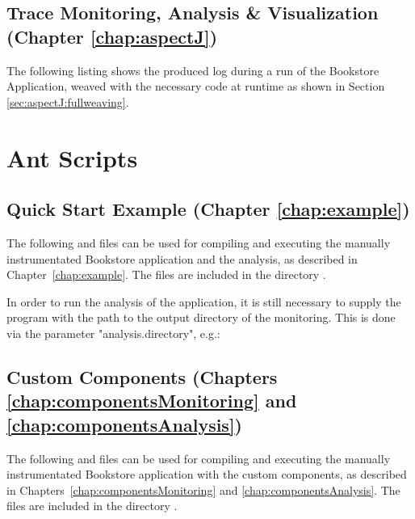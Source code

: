 	\subsection{Trace Monitoring, Analysis \& Visualization (Chapter \ref{chap:aspectJ})}
	    The following listing shows the produced log during a run of the Bookstore Application, weaved with the necessary code at runtime as shown in Section \ref{sec:aspectJ:fullweaving}.
		
	
\newpage
  \section{Ant Scripts}
    \subsection{Quick Start Example (Chapter \ref{chap:example})}
The following  and  files can be %
used for compiling and executing the manually instrumentated Bookstore %
application and the analysis, as described in Chapter~\ref{chap:example}. %
The files are included in the directory \file{\manualInstrumentedBookstoreApplicationDirDistro{}/}.
      \setXMLListing
      
      
      In order to run the analysis of the application, it is still necessary to supply the program with the path to the output directory of the monitoring. This is done via the parameter "analysis.directory", e.g.:
      \setBashListing
      
\newpage
    \subsection{Custom Components (Chapters \ref{chap:componentsMonitoring} and \ref{chap:componentsAnalysis})}
      The following  and  files can be used for compiling and executing the manually instrumentated Bookstore application with the custom components, as described in Chapters~\ref{chap:componentsMonitoring} and \ref{chap:componentsAnalysis}. %
The files are included in the directory \file{\customComponentsBookstoreApplicationDirDistro{}/}.
      \setXMLListing
      
      
\newpage
